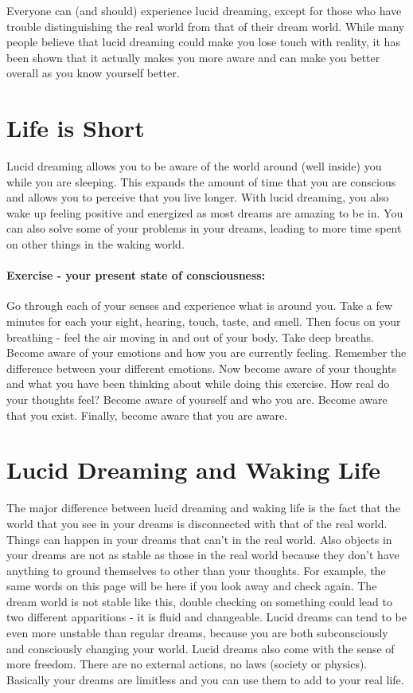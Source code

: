 \documentclass{report}
\begin{document}
Everyone can (and should) experience lucid dreaming, except for those who have trouble distinguishing the real world from that of their dream world. While many people believe that lucid dreaming could make you lose touch with reality, it has been shown that it actually makes you more aware and can make you better overall as you know yourself better.

\section{Life is Short}
Lucid dreaming allows you to be aware of the world around (well inside) you while you are sleeping. This expands the amount of time that you are conscious and allows you to perceive that you live longer. With lucid dreaming, you also wake up feeling positive and energized as most dreams are amazing to be in. You can also solve some of your problems in your dreams, leading to more time spent on other things in the waking world.

\paragraph{Exercise - your present state of consciousness:} Go through each of your senses and experience what is around you. Take a few minutes for each your sight, hearing, touch, taste, and smell. Then focus on your breathing - feel the air moving in and out of your body. Take deep breaths. Become aware of your emotions and how you are currently feeling. Remember the difference between your different emotions. Now become aware of your thoughts and what you have been thinking about while doing this exercise. How real do your thoughts feel? Become aware of yourself and who you are. Become aware that you exist. Finally, become aware that you are aware.

\section{Lucid Dreaming and Waking Life}
The major difference between lucid dreaming and waking life is the fact that the world that you see in your dreams is disconnected with that of the real world. Things can happen in your dreams that can't in the real world. Also objects in your dreams are not as stable as those in the real world because they don't have anything to ground themselves to other than your thoughts. For example, the same words on this page will be here if you look away and check again. The dream world is not stable like this, double checking on something could lead to two different apparitions - it is fluid and changeable. Lucid dreams can tend to be even more unstable than regular dreams, because you are both subconsciously and consciously changing your world. Lucid dreams also come with the sense of more freedom. There are no external actions, no laws (society or physics). Basically your dreams are limitless and you can use them to add to your real life.
\end{document}
